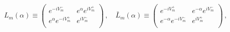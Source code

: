 \begin{equation}
L_{m}(\alpha) \equiv \left (
\begin{array}{cc} e^{-iV_m^-} & e^{\alpha}  e^{iV_m^+} \\ e^{\alpha}
e^{-iV_m^+}&  e^{iV_m^-}\\ \end{array} \right ) \, ,\quad  \bar L_{m}(\alpha)
\equiv \left ( \begin{array}{cc} e^{-iV_m^+} &  e^{-\alpha}   e^{iV_m^-}\\
e^{-\alpha}  e^{-iV_m^-} &   e^{iV_m^+}\\  \end{array} \right ) \, ,
\label{lax}
\end{equation}

